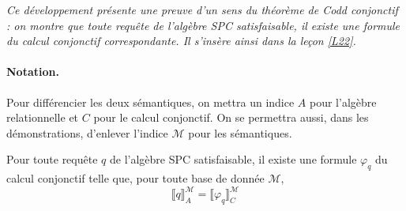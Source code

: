 
\textit{
Ce développement présente une preuve d'un sens du théorème de Codd conjonctif : on montre que toute requête de l'algèbre SPC satisfaisable, il existe une formule du calcul conjonctif correspondante. Il s'insère ainsi dans la leçon \ref{L22}.
}

\paragraph{Notation.} Pour différencier les deux sémantiques, on mettra un indice $A$ pour l'algèbre relationnelle et $C$ pour le calcul conjonctif. On se permettra aussi, dans les démonstrations, d'enlever l'indice $\mathcal{M}$ pour les sémantiques.


\begin{proposition}
Pour toute requête $q$ de l'algèbre SPC satisfaisable, il existe une formule $\varphi_q$ du calcul conjonctif telle que, pour toute base de donnée $\mathcal{M}$, 
$$
\llbracket q \rrbracket^{\mathcal{M}}_A = \llbracket \varphi_q \rrbracket^{\mathcal{M}}_C
$$
\end{proposition} 



